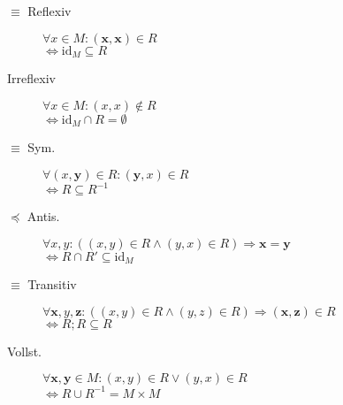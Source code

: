\begin{mzImportant}
  \begin{description}
    \item [$\boldsymbol{\equiv}$ Reflexiv]
          $\forall x \in M: (\mathbf{x}, \mathbf{x}) \in R$ \\
          $\Leftrightarrow \text{id}_M \subseteq R$

    \item [Irreflexiv]
          $\forall x \in M: (x, x) \boldsymbol{\notin} R$ \\
          $\Leftrightarrow \text{id}_M \cap R = \emptyset$

    \item [$\boldsymbol{\equiv}$ Sym.]
          $\forall (x,\mathbf{y}) \in R: (\mathbf{y}, x) \in R$ \\
          $\Leftrightarrow R \subseteq R^{-1}$

    \item [$\boldsymbol{\preceq}$ Antis.]
          $\forall x,y: ((x,y) \in R \land (y,x) \in R) \Rightarrow \mathbf{x = y}$ \\
          $\Leftrightarrow R \cap R' \subseteq \text{id}_M$

    \item [$\boldsymbol{\equiv}$ Transitiv]
          $\forall \mathbf{x},y,\mathbf{z}: ((x,y) \in R \land (y,z) \in R) \Rightarrow (\mathbf{x},\mathbf{z}) \in R$ \\
          $\Leftrightarrow R;R \subseteq R$

    \item [Vollst.]
          $\forall \mathbf{x},\mathbf{y} \in M: (x,y) \in R \lor (y,x) \in R$ \\
          $\Leftrightarrow R \cup R^{-1} = M \times M$
  \end{description}
\end{mzImportant}




